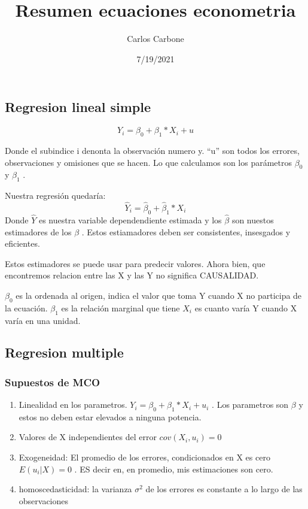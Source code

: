 \documentclass[
]{article}
\title{Resumen ecuaciones econometria}
\author{Carlos Carbone}
\date{7/19/2021}
\begin{document}
\maketitle

\hypertarget{regresion-lineal-simple}{%
\subsection{Regresion lineal simple}\label{regresion-lineal-simple}}

\[
      Y_i=\beta_0+\beta_1*X_i+u
\]

Donde el subindice i denonta la observación numero y. ``u'' son todos
los errores, observaciones y omisiones que se hacen. Lo que calculamos
son los parámetros \(\beta_0\) y \(\beta_1\) .

Nuestra regresión quedaría: \[
      \hat Y_i=\hat \beta_0+\hat \beta_1 *X_i
\] Donde \(\hat Y\) es nuestra variable dependendiente estimada y los
\(\hat\beta\) son nuestos estimadores de los \(\beta\) . Estos
estiamadores deben ser consistentes, insesgados y eficientes.

Estos estimadores se puede usar para predecir valores. Ahora bien, que
encontremos relacion entre las X y las Y no significa CAUSALIDAD.

\(\beta_0\) es la ordenada al origen, indica el valor que toma Y cuando
X no participa de la ecuación. \(\beta_1\) es la relación marginal que
tiene \(X_i\) es cuanto varía Y cuando X varía en una unidad.

\hypertarget{regresion-multiple}{%
\subsection{Regresion multiple}\label{regresion-multiple}}

\hypertarget{supuestos-de-mco}{%
\subsubsection{Supuestos de MCO}\label{supuestos-de-mco}}

\begin{enumerate}
\def\labelenumi{\arabic{enumi}.}
\item
  Linealidad en los parametros. \(Y_i= \beta_0+\beta_1*X_i+u_i\) . Los
  parametros son \(\beta\) y estos no deben estar elevados a ninguna
  potencia.
\item
  Valores de X independientes del error \(cov(X_i,u_i)=0\)
\item
  Exogeneidad: El promedio de los errores, condicionados en X es cero
  \(E(u_i|X)=0\) . ES decir en, en promedio, mis estimaciones son cero.
\item
  homoscedasticidad: la varianza \(\sigma^2\) de los errores es
  constante a lo largo de las observaciones
\end{enumerate}
\end{document}
